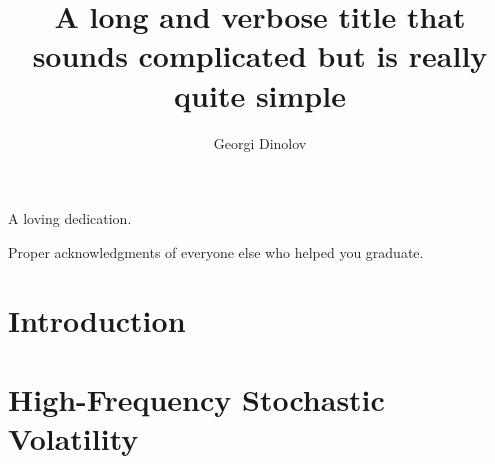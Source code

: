 



\title{A long and verbose title that sounds complicated but is really quite simple}
\author{Georgi Dinolov}
\deanlinethree{}

\begin{frontmatter}
\maketitle

\copyrightpage

\tableofcontents

\listoffigures

\listoftables

\begin{abstract}

\end{abstract}

\begin{dedication}
\vspace*{\fill}
\begin{center}
A loving dedication.
\end{center}
\vspace*{\fill}
\end{dedication}

\begin{acknowledgements}
Proper acknowledgments of everyone else who helped you graduate.
\end{acknowledgements}

\end{frontmatter}

\chapter{Introduction}


\chapter{High-Frequency Stochastic Volatility}

  
